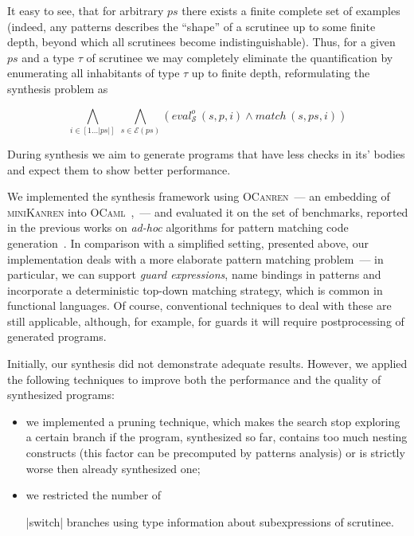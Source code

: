 \documentclass[submission,copyright,creativecommons]{eptcs}
\newcommand*{\SavedLstInline}{}
\DeclareRobustCommand*{\lstinline}{%
  \ifmmode
    \let\SavedBGroup\bgroup
    \def\bgroup{%
      \let\bgroup\SavedBGroup
      \hbox\bgroup
    }%
  \fi
  \SavedLstInline
}
\newcommand{\ir}{\ensuremath{\mathcal{S}}}
\begin{document}
It easy to see, that for arbitrary $ps$ there exists a finite complete set of examples (indeed, any patterns describes the ``shape''
of a scrutinee up to some finite depth, beyond which all scrutinees become indistinguishable). Thus, for a given $ps$ and a type $\tau$ of scrutinee we may
completely eliminate the quantification by enumerating all inhabitants of type $\tau$ up to finite depth, reformulating the synthesis problem as

\[
\bigwedge_{i\in[1\dots|ps|]}\,\bigwedge_{s\in\mathcal{E}(ps)} (eval^o_{\ir}\, (s, p, i) \wedge match\, (s, ps, i))
\]

During synthesis we aim to generate programs that have less checks in its' bodies and expect them to show better performance.

We implemented the synthesis framework using \textsc{OCanren}~--- an embedding of \textsc{miniKanren} into \textsc{OCaml}~\cite{ocanren},~---
and evaluated it on the set of benchmarks, reported in the previous works on \emph{ad-hoc} algorithms for pattern matching
code generation~\cite{maranget2001,maranget2008}. In comparison with a simplified setting, presented above, our implementation
deals with a more elaborate pattern matching problem~--- in particular, we can support \emph{guard expressions}, name bindings in
patterns and incorporate a deterministic top-down matching strategy, which is common in functional languages. Of course, conventional techniques to deal with these are still applicable, although, for example, for guards it will require postprocessing of generated programs.

Initially, our synthesis did not demonstrate adequate results. However, we applied the following techniques to improve both the performance
and the quality of synthesized programs:

\begin{itemize}
\item we implemented a pruning technique, which makes the search stop exploring a certain branch if the program, synthesized so far,
  contains too much nesting constructs (this factor can be precomputed by patterns analysis) or is strictly worse then already synthesized one;
  
\item we restricted the number of \lstinline|switch| branches using type information about subexpressions of scrutinee.
\end{itemize}
\end{document}
